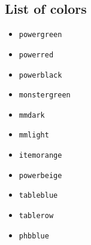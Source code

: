 \documentclass{article}
\begin{document}
\subsection{List of colors}

\begin{itemize}
	\item \color{powergreen}\texttt{powergreen}
	\item \color{powerred}\texttt{powerred}
	\item \color{powerblack}\texttt{powerblack}
	\item \color{monstergreen}\texttt{monstergreen}
	\item \color{mmdark}\texttt{mmdark}
	\item \color{mmlight}\texttt{mmlight}
	\item \color{itemorange}\texttt{itemorange}
	\item \color{powerbeige}\texttt{powerbeige}
	\item \color{tableblue}\texttt{tableblue}
	\item \color{tablerow}\texttt{tablerow}
	\item \color{phbblue}\texttt{phbblue}
\end{itemize}
\end{document}
